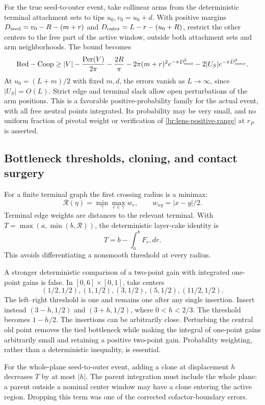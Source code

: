 \documentclass[11pt,a4paper]{article}
\theoremstyle{definition}
\theoremstyle{remark}
\numberwithin{equation}{section}
\begin{document}
For the true seed-to-outer event, take collinear arms from the
deterministic terminal attachment sets to tips $u_0,v_0=u_0+d$.
With positive margins
$D_{\rm seed}=v_0-R-(m+r)$ and
$D_{\rm outer}=L-r-(u_0+R)$, restrict the other centers to the free
part of the active window, outside both attachment sets and arm
neighborhoods. The bound becomes
\[
 \mathrm{Red}-\mathrm{Coop}\ge
 |V|-\frac{\operatorname{Per}(V)}{2\pi}-\frac{2R}{\pi}
 -2\pi(m+r)^2e^{-\pi D_{\rm seed}^2}
 -2|U_S|e^{-\pi D_{\rm outer}^2}.
\]
At $u_0=(L+m)/2$ with fixed $m,d$, the errors vanish as $L\to\infty$,
since $|U_S|=O(L)$. Strict edge and terminal slack allow open
perturbations of the arm positions. This is a favorable
positive-probability family for the actual event, with all free neutral
points integrated. Its probability may be very small, and no uniform
fraction of pivotal weight or verification of
\eqref{br:lens-positive-range} at $r_P$ is asserted.

\subsection{Bottleneck thresholds, cloning, and contact surgery}
\label{br:cloning}

For a finite terminal graph the first crossing radius is a minimax:
\[
 \mathcal R(\eta)=\min_{\gamma}\max_{e\in\gamma}w_e,
 \qquad w_{xy}=|x-y|/2.
\]
Terminal edge weights are distances to the relevant terminal.  With
$T=\max(a,\min(b,\mathcal R))$, the deterministic layer-cake identity is
\[
 T=b-\int_a^bF_r,dr.
\]
This avoids differentiating a nonsmooth threshold at every radius.

A stronger deterministic comparison of a two-point gain with integrated
one-point gains is false.  In $[0,6]\times[0,1]$, take centers
\[
 (1/2,1/2),(1,1/2),(3,1/2),(5,1/2),(11/2,1/2).
\]
The left--right threshold is one and remains one after any single
insertion.  Insert instead $(3-h,1/2)$ and $(3+h,1/2)$, where
$0<h<2/3$.  The threshold becomes $1-h/2$.  The insertions can be
arbitrarily close.  Perturbing the central old point removes the tied
bottleneck while making the integral of one-point gains arbitrarily
small and retaining a positive two-point gain.  Probability weighting,
rather than a deterministic inequality, is essential.

For the whole-plane seed-to-outer event, adding a clone at displacement
$h$ decreases $T$ by at most $|h|$.  The parent integration must include
the whole plane: a parent outside a nominal center window may have a
clone entering the active region.  Dropping this term was one of the
corrected cofactor-boundary errors.
\end{document}
